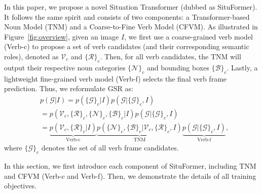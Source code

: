 \documentclass[letterpaper]{article} %
\begin{document}
In this paper, we propose a novel Situation Transformer (dubbed as SituFormer). It follows the same spirit and consists of two components: a Transformer-based Noun Model (TNM) and a Coarse-to-Fine Verb Model (CFVM). As illustrated in Figure~\ref{fig:overview}, given an image $I$, we first use a coarse-grained verb model (Verb-c) to propose a set of verb candidates (and their corresponding semantic roles), denoted as $\mathcal{V}_c$ and $\{\mathcal{R}\}_c$. Then, for all verb candidates, the TNM will output their respective noun categories $\{\mathcal{N}\}_c$ and bounding boxes $\{\mathcal{B}\}_c$. Lastly, a lightweight fine-grained verb model (Verb-f) selects the final verb frame prediction. Thus, we reformulate GSR as:
\begin{equation}
    \begin{aligned} \label{equ:2}
    & p(\mathcal{G} | I) = p (\{\mathcal{G}\}_c | I) p(\mathcal{G} |\{\mathcal{G}\}_c,I) \nonumber \\
    & =  p(\mathcal{V}_c, \{\mathcal{R}\}_c, \{\mathcal{N} \}_c, \{\mathcal{B}\}_c| I) p(\mathcal{G} |\{\mathcal{G}\}_c,I) \\
    & = 
    \underbrace{p(\mathcal{V}_c, \{\mathcal{R}\}_c| I)}_{\text{Verb-c}}
    \underbrace{p(\{\mathcal{N} \}_c, \{\mathcal{B}\}_c|\mathcal{V}_c, \{\mathcal{R}\}_c, I)}_{\text{TNM}}
    \underbrace{p(\mathcal{G} |\{\mathcal{G}\}_c,I) \nonumber}_{\text{Verb-f}},
\end{aligned}
\end{equation}
where $\{\mathcal{G}\}_c$ denotes the set of all verb frame candidates.

In this section, we first introduce each component of SituFormer, including TNM and CFVM (Verb-c and Verb-f). Then, we demonstrate the details of all training objectives.



\end{document}
